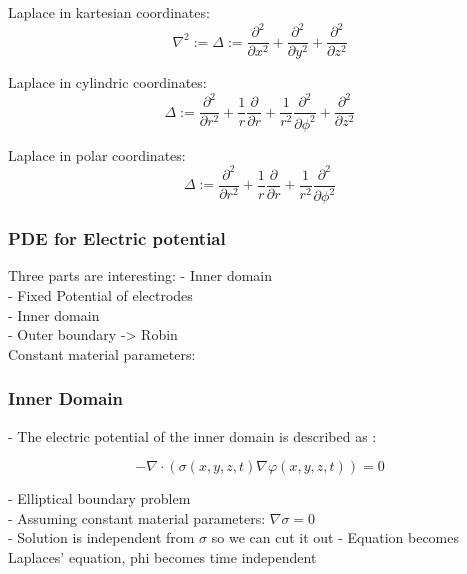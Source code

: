 \documentclass[parskip=half, titlepage=yes, 12pt, BCOR=12mm, DIV=calc]{scrartcl}
\begin{document}
Laplace in kartesian coordinates:
\begin{equation}
    \nabla^2 := \Delta := \frac{\partial^2}{\partial x^2} + \frac{\partial^2}{\partial y^2} + \frac{\partial^2}{\partial z^2}
\end{equation}

Laplace in cylindric coordinates:
\begin{equation}
    \Delta := \frac{\partial^2}{\partial r^2} + \frac{1}{r} \frac{\partial}{\partial r} + \frac{1}{r^2} \frac{\partial^2}{\partial \phi^2} + \frac{\partial^2}{\partial z^2}
\end{equation}

Laplace in polar coordinates:
\begin{equation}
    \Delta := \frac{\partial^2}{\partial r^2} + \frac{1}{r} \frac{\partial}{\partial r} + \frac{1}{r^2} \frac{\partial^2}{\partial \phi^2}
\end{equation}



\subsubsection{PDE for Electric potential}

Three parts are interesting:
- Inner domain \\
- Fixed Potential of electrodes \\
- Inner domain \\
- Outer boundary -> Robin \\

Constant material parameters: \\

\subsubsection{Inner Domain}

- The electric potential of the inner domain is described as : 

\begin{equation}
    - \nabla \cdot (\sigma(x,y,z,t) \nabla \varphi(x,y,z,t)) = 0
\end{equation}

- Elliptical boundary problem \\
- Assuming constant material parameters: $\nabla \sigma = 0$ \\
- Solution is independent from $\sigma$ so we can cut it out
- Equation becomes Laplaces' equation, phi becomes time independent \\
\end{document}
